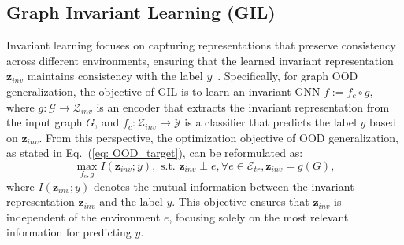 \subsection{Graph Invariant Learning (GIL)}
Invariant learning focuses on capturing representations that preserve consistency across different environments, ensuring that the learned invariant representation $\mathbf{z}_{inv}$ maintains consistency with the label $y$~\citep{mitrovic2020representation,wu2022discovering,chen2022learning}. Specifically, for graph OOD generalization, the objective of GIL is to learn an invariant GNN $f:= f_{c} \circ g$, where $g: \mathcal{G} \rightarrow \mathcal{Z}_{inv}$ is an encoder that extracts the invariant representation from the input graph $G$, and $f_{c}: \mathcal{Z}_{inv} \rightarrow \mathcal{Y}$ is a classifier that predicts the label $y$ based on $\mathbf{z}_{inv}$. From this perspective, the optimization objective of OOD generalization, as stated in Eq.~(\ref{eq: OOD_target}), can be reformulated as: 
\begin{equation}
\label{eq: causal} \max_{f_{c}, g} I(\mathbf{z}_{inv}; y), \text{ s.t. } \mathbf{z}_{inv} \perp e,\forall e \in \mathcal{E}_{tr}, \mathbf{z}_{inv} = g(G),
\end{equation}
{where $I(\mathbf{z}_{inv}; y)$ denotes the mutual information between the invariant representation $\mathbf{z}_{inv}$ and the label $y$.}
This objective ensures that $\mathbf{z}_{inv}$ is independent of the environment $e$, focusing solely on the most relevant information for predicting $y$. 

